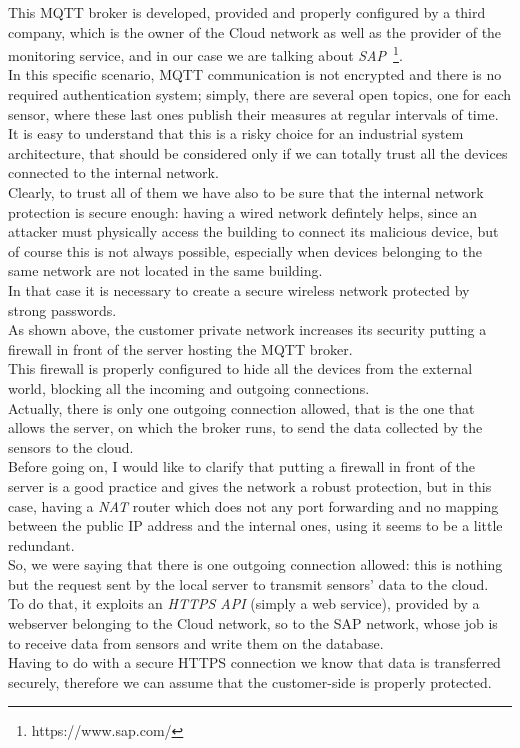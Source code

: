 \documentclass[12pt]{report}
\begin{document}
{{This MQTT broker is developed, provided and properly configured by a third company, which is the owner of the Cloud network as well as the provider of the monitoring service, and in our case we are talking about \emph{SAP}~\footnote{https://www.sap.com/}.\\
In this specific scenario, MQTT communication is not encrypted and there is no required authentication system; simply, there are several open topics, one for each sensor, where these last ones publish their measures at regular intervals of time.\\
It is easy to understand that this is a risky choice for an industrial system architecture, that should be considered only if we can totally trust all the devices connected to the internal network.\\
Clearly, to trust all of them we have also to be sure that the internal network protection is secure enough: having a wired network defintely helps, since an attacker must physically access the building to connect its malicious device, but of course this is not always possible, especially when devices belonging to the same network are not located in the same building.\\
In that case it is necessary to create a secure wireless network protected by strong passwords.\\

As shown above, the customer private network increases its security putting a firewall in front of the server hosting the MQTT broker.\\
This firewall is properly configured to hide all the devices from the external world, blocking all the incoming and outgoing connections.\\
Actually, there is only one outgoing connection allowed, that is the one that allows the server, on which the broker runs, to send the data collected by the sensors to the cloud.\\
Before going on, I would like to clarify that putting a firewall in front of the server is a good practice and gives the network a robust protection, but in this case, having a \emph{NAT} router which does not any port forwarding and no mapping between the public IP address and the internal ones, using it seems to be a little redundant.\\

So, we were saying that there is one outgoing connection allowed: this is nothing but the request sent by the local server to transmit sensors' data to the cloud.\\
To do that, it exploits an \emph{HTTPS API} (simply a web service), provided by a webserver belonging to the Cloud network, so to the SAP network, whose job is to receive data from sensors and write them on the database.\\
Having to do with a secure HTTPS connection we know that data is transferred securely, therefore we can assume that the customer-side is properly protected.\\

}}
\end{document}
